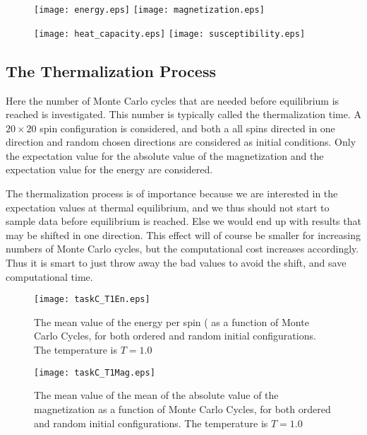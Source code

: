 \documentclass[11pt, a4paper]{article}
\begin{document}
\begin{figure}[!ht]
\texttt{[image: energy.eps]}
\texttt{[image: magnetization.eps]}
\end{figure}

\begin{figure}[!ht]
\texttt{[image: heat\_capacity.eps]}
\texttt{[image: susceptibility.eps]}
\end{figure}
\clearpage

\subsection{The Thermalization Process}
Here the number of Monte Carlo cycles that are needed before equilibrium is reached is investigated. This number is typically called the thermalization time. A $20\times 20$ spin configuration is considered, and both a all spins directed in one direction and random chosen directions are considered as initial conditions. Only the expectation value for the absolute value of the magnetization and the expectation value for the energy are considered. 

The thermalization process is of importance because we are interested in the expectation values at thermal equilibrium, and we thus should not start to sample data before equilibrium is reached. Else we would end up with results that may be shifted in one direction. This effect will of course be smaller for increasing numbers of Monte Carlo cycles, but the computational cost increases accordingly. Thus it is smart to just throw away the bad values to avoid the shift, and save computational time.

\begin{figure}[!ht]
\texttt{[image: taskC\_T1En.eps]}
\caption{The mean value of the energy per spin ( as a function of Monte Carlo Cycles, for both ordered and random initial configurations. The temperature is $T=1.0$}
\label{fig:EnT1}
\end{figure}

\begin{figure}[!ht]
\texttt{[image: taskC\_T1Mag.eps]}
\caption{The mean value of the mean of the absolute value of the magnetization as a function of Monte Carlo Cycles, for both ordered and random initial configurations. The temperature is $T=1.0$}
\label{fig:magT1}
\end{figure} 
\end{document}
